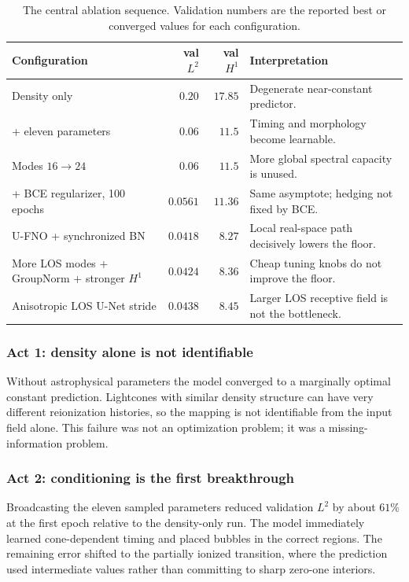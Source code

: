 \documentclass[11pt,a4paper]{article}
\newcommand{\Ltwo}{L^2}
\newcommand{\Hone}{H^1}
\begin{document}
\begin{table}[H]
\centering
\caption{The central ablation sequence. Validation numbers are the reported
best or converged values for each configuration.}
\small
\begin{tabularx}{\textwidth}{@{}XrrX@{}}
\toprule
Configuration & val \(\Ltwo\) & val \(\Hone\) & Interpretation \\
\midrule
Density only & \(0.20\) & \(17.85\) & Degenerate near-constant predictor. \\
+ eleven parameters & \(0.06\) & \(11.5\) & Timing and morphology become learnable. \\
Modes \(16\to24\) & \(0.06\) & \(11.5\) & More global spectral capacity is unused. \\
+ BCE regularizer, 100 epochs & \(0.0561\) & \(11.36\) & Same asymptote; hedging not fixed by BCE. \\
U-FNO + synchronized BN & \(\mathbf{0.0418}\) & \(\mathbf{8.27}\) &
Local real-space path decisively lowers the floor. \\
More LOS modes + GroupNorm + stronger \(\Hone\) & \(0.0424\) & \(8.36\) &
Cheap tuning knobs do not improve the floor. \\
Anisotropic LOS U-Net stride & \(0.0438\) & \(8.45\) &
Larger LOS receptive field is not the bottleneck. \\
\bottomrule
\end{tabularx}
\end{table}

\subsubsection{Act 1: density alone is not identifiable}

Without astrophysical parameters the model converged to a marginally optimal
constant prediction. Lightcones with similar density structure can have very
different reionization histories, so the mapping is not identifiable from the
input field alone. This failure was not an optimization problem; it was a
missing-information problem.

\subsubsection{Act 2: conditioning is the first breakthrough}

Broadcasting the eleven sampled parameters reduced validation \(\Ltwo\) by
about \(61\%\) at the first epoch relative to the density-only run. The model
immediately learned cone-dependent timing and placed bubbles in the correct
regions. The remaining error shifted to the partially ionized transition,
where the prediction used intermediate values rather than committing to sharp
zero-one interiors.
\end{document}
